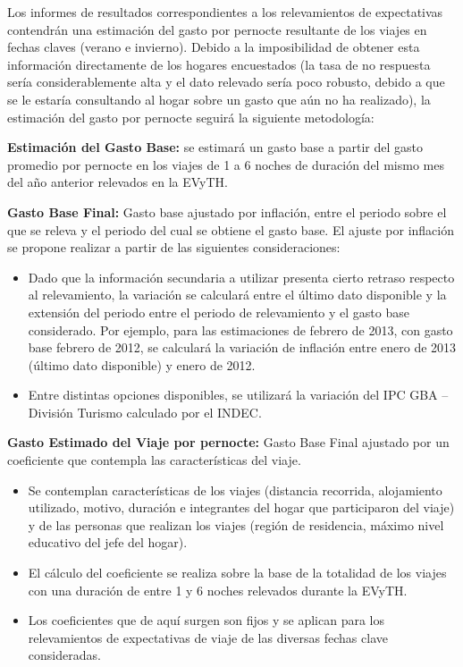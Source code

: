 \documentclass[
  openany]{book}
\begin{document}
Los informes de resultados correspondientes a los relevamientos de expectativas contendrán una estimación del gasto por pernocte resultante de los viajes en fechas claves (verano e invierno). Debido a la imposibilidad de obtener esta información directamente de los hogares encuestados (la tasa de no respuesta sería considerablemente alta y el dato relevado sería poco robusto, debido a que se le estaría consultando al hogar sobre un gasto que aún no ha realizado), la estimación del gasto por pernocte seguirá la siguiente metodología:

\textbf{Estimación del Gasto Base:} se estimará un gasto base a partir del gasto promedio por pernocte en los viajes de 1 a 6 noches de duración del mismo mes del año anterior relevados en la EVyTH.

\textbf{Gasto Base Final:} Gasto base ajustado por inflación, entre el periodo sobre el que se releva y el periodo del cual se obtiene el gasto base. El ajuste por inflación se propone realizar a partir de las siguientes consideraciones:

\begin{itemize}
\item
  Dado que la información secundaria a utilizar presenta cierto retraso respecto al relevamiento, la variación se calculará entre el último dato disponible y la extensión del periodo entre el periodo de relevamiento y el gasto base considerado. Por ejemplo, para las estimaciones de febrero de 2013, con gasto base febrero de 2012, se calculará la variación de inflación entre enero de 2013 (último dato disponible) y enero de 2012.
\item
  Entre distintas opciones disponibles, se utilizará la variación del IPC GBA -- División Turismo calculado por el INDEC.
\end{itemize}

\textbf{Gasto Estimado del Viaje por pernocte:} Gasto Base Final ajustado por un coeficiente que contempla las características del viaje.

\begin{itemize}
\item
  Se contemplan características de los viajes (distancia recorrida, alojamiento utilizado, motivo, duración e integrantes del hogar que participaron del viaje) y de las personas que realizan los viajes (región de residencia, máximo nivel educativo del jefe del hogar).
\item
  El cálculo del coeficiente se realiza sobre la base de la totalidad de los viajes con una duración de entre 1 y 6 noches relevados durante la EVyTH.
\item
  Los coeficientes que de aquí surgen son fijos y se aplican para los relevamientos de expectativas de viaje de las diversas fechas clave consideradas.
\end{itemize}
\end{document}
